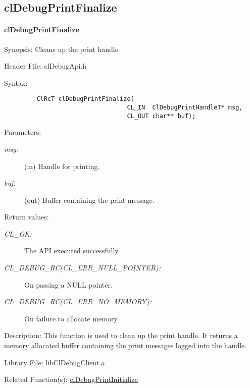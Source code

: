 \subsection{clDebugPrintFinalize}
\hypertarget{pagedbg108}{}\paragraph{cl\-Debug\-Print\-Finalize}\label{pagedbg108}
\begin{Desc}
\item[Synopsis:]Cleans up the print handle.\end{Desc}
\begin{Desc}
\item[Header File:]clDebugApi.h\end{Desc}
\begin{Desc}
\item[Syntax:]

\footnotesize\begin{verbatim}         ClRcT clDebugPrintFinalize(
                 		          CL_IN  ClDebugPrintHandleT* msg,
                 		          CL_OUT char** buf);
\end{verbatim}
\normalsize
\end{Desc}
\begin{Desc}
\item[Parameters:]
\begin{description}
\item[{\em msg:}](in) Handle for printing. \item[{\em buf:}](out) Buffer containing the print message.\end{description}
\end{Desc}
\begin{Desc}
\item[Return values:]
\begin{description}
\item[{\em CL\_\-OK:}]The API executed successfully. \item[{\em CL\_\-DEBUG\_\-RC(CL\_\-ERR\_\-NULL\_\-POINTER):}]On passing a NULL pointer. \item[{\em CL\_\-DEBUG\_\-RC(CL\_\-ERR\_\-NO\_\-MEMORY):}]On failure to allocate memory.\end{description}
\end{Desc}
\begin{Desc}
\item[Description:]This function is used to clean up the print handle. It returns a memory allocated buffer containing the print messages logged into the handle.\end{Desc}
\begin{Desc}
\item[Library File:]lib\-Cl\-Debug\-Client.a\end{Desc}
\begin{Desc}
\item[Related Function(s):]\hyperlink{pagedbg106}{cl\-Debug\-Print\-Initialize} \end{Desc}
\newpage


